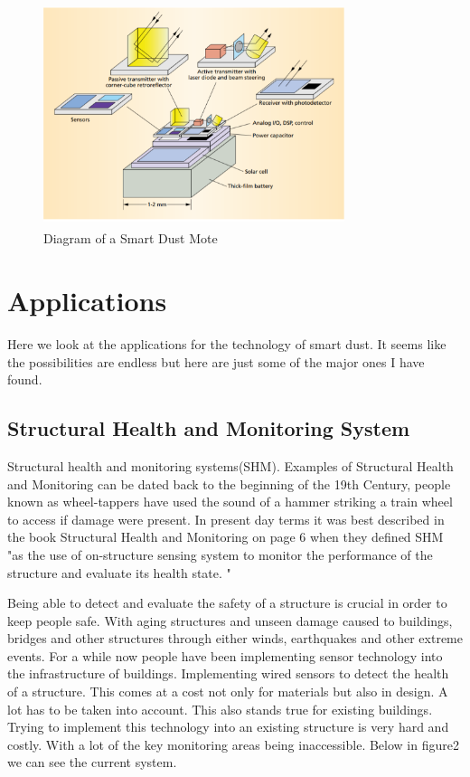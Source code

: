 \documentclass[article]{IEEEtran}
\begin{document}
\begin{figure}[h!]
\graphicspath{ {images/} }
\includegraphics[width=8.8cm, height=6.5cm]{figure1}
\caption{Diagram of a Smart Dust Mote\cite{Mili}}
\end{figure}

\section{Applications}
Here we look at the applications for the technology of smart dust. It seems like the possibilities are endless but here are just some of the major ones I have found.

\subsection{Structural Health and Monitoring System}
Structural health and monitoring systems(SHM). Examples of Structural Health and Monitoring can be dated back to the beginning of the 19th Century, people known as wheel-tappers have used the sound of a hammer striking a train wheel to access if damage were present. In present day terms it was best described in the book Structural Health and Monitoring on page 6 when they defined SHM "as the use of on-structure sensing system to monitor the performance   of   the   structure   and   evaluate   its   health   state. "\cite{SHM}

Being able to detect and evaluate the safety of a structure is crucial in order to keep people safe. With aging structures and unseen damage caused to buildings, bridges and other structures through either winds, earthquakes and other extreme events. For a while now people have been implementing sensor technology into the infrastructure of buildings. Implementing wired sensors to detect the health of a structure. This comes at a cost not only for materials but also in design. A lot has to be taken into account. This also stands true for existing buildings. Trying to implement this technology into an existing structure is very hard and costly. With a lot of the key monitoring areas being inaccessible. Below in figure2 we can see the current system.
\end{document}
